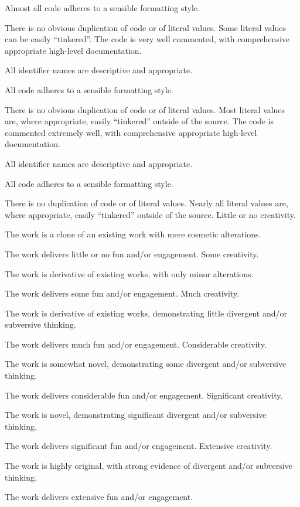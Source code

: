 \begin{markingrubric}
            \par Almost all code adheres to a sensible formatting style.
             \par There is no obvious duplication of code or of literal values. Some literal values can be easily ``tinkered''. 
        \grade The code is very well commented, with comprehensive appropriate high-level documentation.
            \par All identifier names are descriptive and appropriate.
            \par All code adheres to a sensible formatting style.
             \par There is no obvious duplication of code or of literal values. Most literal values are, where appropriate, easily ``tinkered'' outside of the source.  
        \grade The code is commented extremely well, with comprehensive appropriate high-level documentation.
            \par All identifier names are descriptive and appropriate.
            \par All code adheres to a sensible formatting style.
            \par There is no duplication of code or of literal values. Nearly all literal values are, where appropriate, easily ``tinkered'' outside of the source.  
%
        \grade\fail Little or no creativity.
            \par The work is a clone of an existing work with mere cosmetic alterations.
            \par The work delivers little or no fun and/or engagement.
        \grade Some creativity.
            \par The work is derivative of existing works, with only minor alterations.
            \par The work delivers some fun and/or engagement.
        \grade Much creativity.
            \par The work is derivative of existing works, demonstrating little divergent and/or subversive thinking.
            \par The work delivers much fun and/or engagement.
        \grade Considerable creativity.
            \par The work is somewhat novel, demonstrating some divergent and/or subversive thinking.
            \par The work delivers considerable fun and/or engagement.
        \grade Significant creativity.
            \par The work is novel, demonstrating significant divergent and/or subversive thinking.
            \par The work delivers significant fun and/or engagement.
        \grade Extensive creativity.
            \par The work is highly original, with strong evidence of divergent and/or subversive thinking.
            \par The work delivers extensive fun and/or engagement.
    \label{p:part1-end}
\end{markingrubric}
